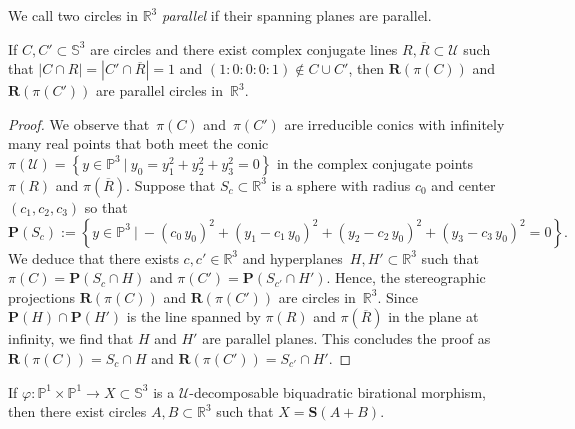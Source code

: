 \documentclass[11pt]{article}
\newcommand{\R}{\mathbb{R}}
\renewcommand{\P}{\mathbb{P}}
\renewcommand{\S}{\mathbb{S}}
\newcommand{\bP}{\mathbf{P}}
\newcommand{\bR}{\mathbf{R}}
\newcommand{\bS}{\mathbf{S}}
\newcommand{\cU}{\mathcal{U}}
\newcommand{\oR}{{\overline{R}}}
\renewcommand{\c}{\colon}
\newcommand{\set}[2]{\left\{#1 ~|~ #2\right\}}
\newcommand{\df}{\emph}
\newcommand{\st}{such that }
\begin{document}
We call two circles in $\R^3$ \df{parallel} if their spanning planes are parallel.

\begin{lemma}
\label{lem:LLpar}
If $C,C'\subset\S^3$ are circles and
there exist complex conjugate lines $R,\oR\subset\cU$
\st
$|C\cap R|=|C'\cap\oR|=1$
and
$(1:0:0:0:1)\notin C\cup C'$,
then
$\bR(\pi(C))$ and $\bR(\pi(C'))$ are parallel circles in~$\R^3$.
\end{lemma}

\begin{proof}
We observe that~$\pi(C)$ and~$\pi(C')$ are irreducible conics with infinitely many real points
that both meet the conic~$\pi(\cU)=\set{y\in\P^3}{y_0=y_1^2+y_2^2+y_3^2=0}$
in the complex conjugate points $\pi(R)$ and $\pi(\oR)$.
Suppose that $S_c\subset\R^3$ is a sphere with radius $c_0$ and center $(c_1,c_2,c_3)$ so that
\[
\bP(S_c):=\set{y\in\P^3}{-(c_0\,y_0)^2+(y_1-c_1\,y_0)^2+(y_2-c_2\,y_0)^2+(y_3-c_3\,y_0)^2=0}.
\]
We deduce that there exists $c,c'\in\R^3$ and hyperplanes~$H,H'\subset\R^3$
\st $\pi(C)=\bP(S_c\cap H)$ and $\pi(C')=\bP(S_{c'}\cap H')$.
Hence, the stereographic projections $\bR(\pi(C))$ and $\bR(\pi(C'))$ are circles in~$\R^3$.
Since $\bP(H)\cap\bP(H')$ is the line spanned by $\pi(R)$ and $\pi(\oR)$ in the plane at infinity,
we find that $H$ and $H'$ are parallel planes.
This concludes the proof as $\bR(\pi(C))=S_c\cap H$ and $\bR(\pi(C'))=S_{c'}\cap H'$.
\end{proof}

\begin{proposition}
\label{prp:UAB}
If $\varphi\c\P^1\times\P^1\to X\subset \S^3$ is a $\cU$-decomposable biquadratic birational morphism,
then there exist circles $A,B\subset\R^3$ \st
$X=\bS(A+B)$.
\end{proposition}
\end{document}
